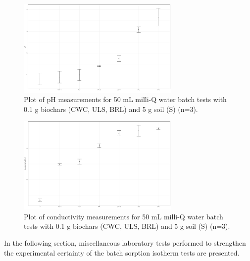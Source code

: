 \begin{figure} 
\centering
\includegraphics[width=0.7\textwidth]{R/figs/pH.pdf}
\caption{Plot of pH measurements for 50 mL milli-Q water batch tests with 0.1 g biochars (CWC, ULS, BRL) and 5 g soil (S) (n=3).}
\label{appfig:pH}
\end{figure}

\begin{figure} 
\centering
\includegraphics[width=0.7\textwidth]{R/figs/conductivity.pdf}
\caption{Plot of conductivity measurements for 50 mL milli-Q water batch tests with 0.1 g biochars (CWC, ULS, BRL) and 5 g soil (S) (n=3).}
\label{appfig:cond}
\end{figure}


In the following section, miscellaneous laboratory tests performed to strengthen the experimental certainty of the batch sorption isotherm tests are presented. 